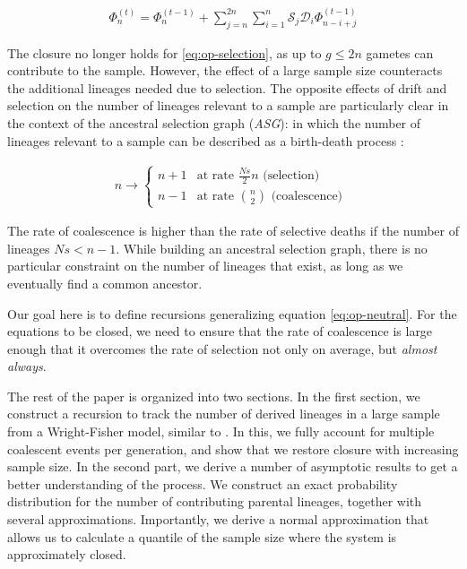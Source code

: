 \documentclass[review]{elsarticle}
\newcommand{\ra}{\rightarrow}
\begin{document}
\begin{align}
  \label{eq:op-selection}
  \Phi_{n}^{(t)}=\Phi_{n}^{(t-1)}+ \sum_{j=n}^{2n} \sum_{i=1}^{n} \mathcal{S}_j \mathcal{D}_i \Phi_{n-i+j}^{(t-1)}
\end{align}

The closure no longer holds for \eqref{eq:op-selection}, as up to $g \le 2n$ gametes can contribute
to the sample. However, the effect of a large sample size counteracts the additional lineages needed
due to selection. The opposite effects of drift and selection on the number of lineages relevant to
a sample are particularly clear in the context of the ancestral selection graph (\textit{ASG}): in
which the number of lineages relevant to a sample can be described as a birth-death process
\cite{KroneNeuhauser1997, Wakeley2009}:

\begin{align}
  \label{eq:asg-size}
  n \ra \begin{cases}
      n+1 & \text{at rate } \frac{Ns}{2} n  \text{ (selection) }\\
      n-1 & \text{at rate } \binom{n}{2} \text{ (coalescence) }
    \end{cases}
\end{align}

The rate of coalescence is higher than the rate of selective deaths if the number of lineages $Ns<
n-1$. While building an ancestral selection graph, there is no particular constraint on the number
of lineages that exist, as long as we eventually find a common ancestor.

Our goal here is to define recursions generalizing equation \eqref{eq:op-neutral}. For the equations
to be closed, we need to ensure that the rate of coalescence is large enough that it overcomes the
rate of selection not only on average, but \emph{almost always}.

The rest of the paper is organized into two sections. In the first section, we construct a recursion
to track the number of derived lineages in a large sample from a Wright-Fisher model, similar to
\cite{JouganousEtAl2017,KammEtAl2017}. In this, we fully account for multiple coalescent events per
generation, and show that we restore closure with increasing sample size. In the second part, we
derive a number of asymptotic results to get a better understanding of the process. We construct an
exact probability distribution for the number of contributing parental lineages, together with
several approximations. Importantly, we derive a normal approximation that allows us to calculate a
quantile of the sample size where the system is approximately closed.
\end{document}
